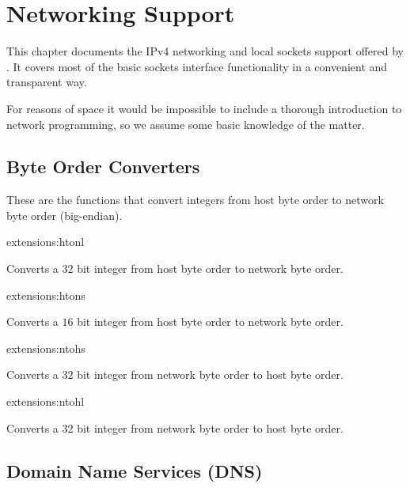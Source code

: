 \chapter{Networking Support}
\label{internet}


This chapter documents the IPv4 networking and local sockets support
offered by \cmucl{}. It covers most of the basic sockets interface
functionality in a convenient and transparent way.

For reasons of space it would be impossible to include a thorough
introduction to network programming, so we assume some basic knowledge
of the matter.

\section{Byte Order Converters}

These are the functions that convert integers from host byte order to
network byte order (big-endian).

\begin{defun}{extensions:}{htonl}{%
    }
  
  Converts a $32$ bit integer from host byte order to network byte
  order.

\end{defun}

\begin{defun}{extensions:}{htons}{%
    }
  
  Converts a $16$ bit integer from host byte order to network byte
  order.

\end{defun}

\begin{defun}{extensions:}{ntohs}{%
    }
  
  Converts a $32$ bit integer from network byte order to host
  byte order.

\end{defun}

\begin{defun}{extensions:}{ntohl}{%
    }
  
  Converts a $32$ bit integer from network byte order to host byte
  order.

\end{defun}

\section{Domain Name Services (DNS)}

